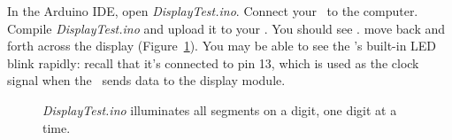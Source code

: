 \begin{table}
\caption{Electrical Connections for External LED.\label{tab:display}}
\end{table}


In the Arduino IDE, open \textit{DisplayTest.ino}.
Connect your \developmentboard\ to the computer.
Compile \textit{DisplayTest.ino} and upload it to your \developmentboard.
You should see {.} move back and forth across the display (Figure~\ref{fig:display-test}).
You may be able to see the \developmentboard's built-in LED blink rapidly: recall that it's connected to pin 13, which is used as the clock signal when the \developmentboard\ sends data to the display module.

\begin{figure}
    \centering
    \caption{\textit{DisplayTest.ino} illuminates all segments on a digit, one digit at a time. \label{fig:display-test}}
\end{figure}
